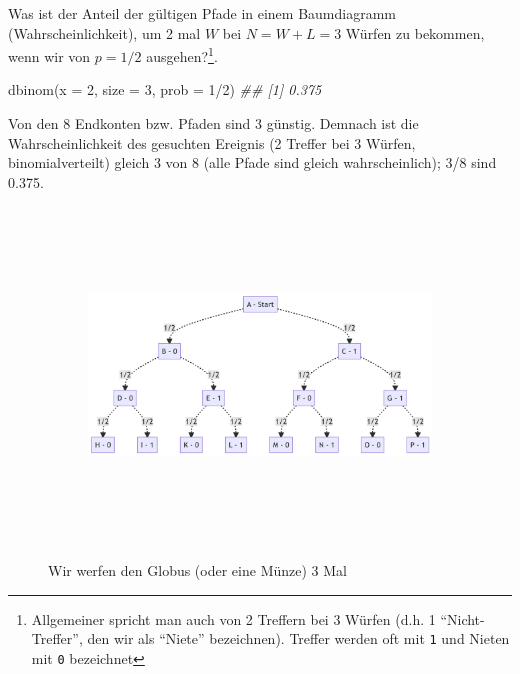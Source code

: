 \documentclass[
  a4paper,
  DIV=11]{scrreprt}
\newenvironment{Shaded}{\begin{snugshade}}{\end{snugshade}}
\newcommand{\AttributeTok}[1]{\textcolor[rgb]{0.40,0.45,0.13}{#1}}
\newcommand{\DecValTok}[1]{\textcolor[rgb]{0.68,0.00,0.00}{#1}}
\newcommand{\DocumentationTok}[1]{\textcolor[rgb]{0.37,0.37,0.37}{\textit{#1}}}
\newcommand{\FunctionTok}[1]{\textcolor[rgb]{0.28,0.35,0.67}{#1}}
\newcommand{\NormalTok}[1]{\textcolor[rgb]{0.00,0.23,0.31}{#1}}
\newcommand{\SpecialCharTok}[1]{\textcolor[rgb]{0.37,0.37,0.37}{#1}}
\theoremstyle{definition}
\theoremstyle{remark}
\begin{document}
Was ist der Anteil der gültigen Pfade in einem Baumdiagramm
(Wahrscheinlichkeit), um 2 mal \(W\) bei \(N=W+L=3\) Würfen zu bekommen,
wenn wir von \(p=1/2\) ausgehen?\footnote{Allgemeiner spricht man auch
  von 2 Treffern bei 3 Würfen (d.h. 1 ``Nicht-Treffer'', den wir als
  ``Niete'' bezeichnen). Treffer werden oft mit \texttt{1} und Nieten
  mit \texttt{0} bezeichnet}.

\begin{Shaded}
\begin{Highlighting}[]
\FunctionTok{dbinom}\NormalTok{(}\AttributeTok{x =} \DecValTok{2}\NormalTok{, }\AttributeTok{size =} \DecValTok{3}\NormalTok{, }\AttributeTok{prob =} \DecValTok{1}\SpecialCharTok{/}\DecValTok{2}\NormalTok{)}
\DocumentationTok{\#\# [1] 0.375}
\end{Highlighting}
\end{Shaded}

Von den 8 Endkonten bzw. Pfaden sind 3 günstig. Demnach ist die
Wahrscheinlichkeit des gesuchten Ereignis (2 Treffer bei 3 Würfen,
binomialverteilt) gleich 3 von 8 (alle Pfade sind gleich
wahrscheinlich); 3/8 sind 0.375.

\begin{figure}

{\centering 

\begin{figure}[H]

{\centering \includegraphics[width=5.5in,height=3.5in]{./Globusversuch_files/figure-latex/mermaid-figure-2.png}

}

\end{figure}

}

\caption{\label{fig-binom1a}Wir werfen den Globus (oder eine Münze) 3
Mal}

\end{figure}
\end{document}
